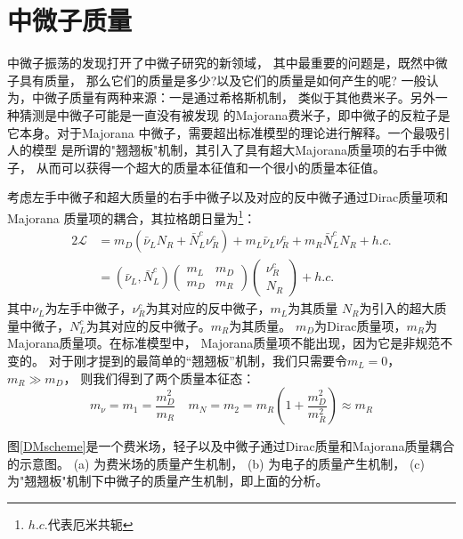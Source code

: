 \section{中微子质量}\label{sec:neutrino_mass}
中微子振荡的发现打开了中微子研究的新领域，
其中最重要的问题是，既然中微子具有质量，
那么它们的质量是多少?以及它们的质量是如何产生的呢?
一般认为，中微子质量有两种来源：一是通过希格斯机制，
类似于其他费米子。另外一种猜测是中微子可能是一直没有被发现
的Majorana费米子，即中微子的反粒子是它本身。对于Majorana
中微子，需要超出标准模型的理论进行解释。一个最吸引人的模型
是所谓的"翘翘板"机制，其引入了具有超大Majorana质量项的右手中微子，
从而可以获得一个超大的质量本征值和一个很小的质量本征值。


考虑左手中微子和超大质量的右手中微子以及对应的反中微子通过Dirac质量项和Majorana
质量项的耦合，其拉格朗日量为\cite{zuber2020neutrino}\footnote{$h.c.$代表厄米共轭}：
\begin{align}
    \label{Lagrangian_D-M}
    2\mathcal{L} &= m_D (\bar{\nu}_L N_R + \bar{N}_L^c \nu_R^c) + m_L \bar{\nu}_L \nu_R^c + m_R \bar{N}_L^c N_R + h.c. \\
    &= (\bar{\nu}_L, \bar{N}_L^c) 
    \begin{pmatrix}
    m_L & m_D \\
    m_D & m_R
    \end{pmatrix}
    \begin{pmatrix}
    \nu_R^c \\
    N_R
    \end{pmatrix}
    + h.c.
\end{align}
其中$\nu_L$为左手中微子，$\nu^c_R$为其对应的反中微子，$m_L$为其质量
$N_R$为引入的超大质量中微子，$N^c_L$为其对应的反中微子。$m_R$为其质量。
$m_D$为Dirac质量项，$m_R$为Majorana质量项。在标准模型中，
Majorana质量项不能出现，因为它是非规范不变的。
对于刚才提到的最简单的“翘翘板”机制，我们只需要令$m_L=0$，$m_R\gg m_D$，
则我们得到了两个质量本征态：
\begin{equation}
    m_\nu = m_1 = \frac{m^2_D}{m_R} \quad m_N = m_2
    = m_R\left (1+\frac{m^2_D}{m^2_R}\right) \approx m_R
\end{equation}


    
图\ref{DMscheme}是一个费米场，轻子以及中微子通过Dirac质量和Majorana质量耦合的示意图。
 (a) 为费米场的质量产生机制， (b) 为电子的质量产生机制， (c) 为"翘翘板"机制下中微子的质量产生机制，即上面的分析。


